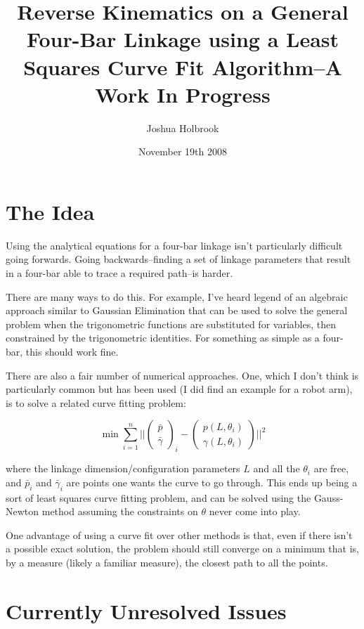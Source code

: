 \documentclass[12pt, letterpaper]{article}
\begin{document}
\title{Reverse Kinematics on a General Four-Bar Linkage using a Least Squares Curve Fit Algorithm--A Work In Progress}
\author{Joshua Holbrook}
\date{November 19th 2008}
\maketitle

\section*{The Idea}Using the analytical equations for a four-bar linkage isn't particularly difficult going forwards.  Going backwards--finding a set of linkage parameters that result in a four-bar able to trace a required path--is harder.

There are many ways to do this. For example, I've heard legend of an algebraic approach similar to Gaussian Elimination that can be used to solve the general problem when the trigonometric functions are substituted for variables, then constrained by the trigonometric identities. For something as simple as a four-bar, this should work fine.

There are also a fair number of numerical approaches. One, which I don't think is particularly common but has been used (I did find an example for a robot arm), is to solve a related curve fitting problem:

\[\min \sum_{i=1}^n\bigg|\bigg|\begin{pmatrix}\bar{p} \\ \bar{\gamma}\end{pmatrix}_i -
\begin{pmatrix}p(L,\theta_i) \\ \gamma(L,\theta_i)\end{pmatrix} \bigg|\bigg|^2\]

where the linkage dimension/configuration parameters \(L\) and all the \(\theta_i\) are free, and \(\bar{p}_i\) and \(\bar{\gamma}_i\) are points one wants the curve to go through. This ends up being a sort of least squares curve fitting problem, and can be solved using the Gauss-Newton method assuming the constraints on \(\theta\) never come into play.

One advantage of using a curve fit over other methods is that, even if there isn't a possible exact solution, the problem should still converge on a minimum that is, by a measure (likely a familiar measure), the closest path to all the points.

\section*{Currently Unresolved Issues}
\end{document}
